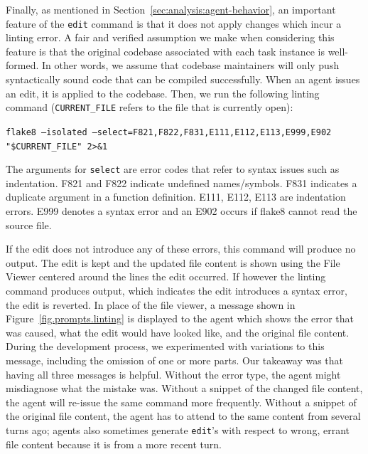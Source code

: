 Finally, as mentioned in Section~\ref{sec:analysis:agent-behavior}, an important feature of the \texttt{edit} command is that it does not apply changes which incur a linting error.
A fair and verified assumption we make when considering this feature is that the original codebase associated with each task instance is well-formed.
In other words, we assume that codebase maintainers will only push syntactically sound code that can be compiled successfully.
When an agent issues an edit, it is applied to the codebase.
Then, we run the following linting command (\texttt{CURRENT\_FILE} refers to the file that is currently open):

\texttt{flake8 ---isolated ---select=F821,F822,F{831},E{111},E{112},E{113},E{999},E{902} "\$CURRENT\_FILE" {2}>\&{1}}

The arguments for \texttt{select} are error codes that refer to syntax issues such as indentation.
F\num{821} and F\num{822} indicate undefined names/symbols.
F\num{831} indicates a duplicate argument in a function definition.
E\num{111}, E\num{112}, E\num{113} are indentation errors.
E\num{999} denotes a syntax error and an E\num{902} occurs if flake\num{8} cannot read the source file.

If the edit does not introduce any of these errors, this command will produce no output.
The edit is kept and the updated file content is shown using the File Viewer centered around the lines the edit occurred.
If however the linting command produces output, which indicates the edit introduces a syntax error, the edit is reverted.
In place of the file viewer, a message shown in Figure~\ref{fig.prompts.linting} is displayed to the agent which shows the error that was caused, what the edit would have looked like, and the original file content.
During the development process, we experimented with variations to this message, including the omission of one or more parts.
Our takeaway was that having all three messages is helpful.
Without the error type, the agent might misdiagnose what the mistake was.
Without a snippet of the changed file content, the agent will re-issue the same command more frequently.
Without a snippet of the original file content, the agent has to attend to the same content from several turns ago; agents also sometimes generate \texttt{edit}'s with respect to wrong, errant file content because it is from a more recent turn.



